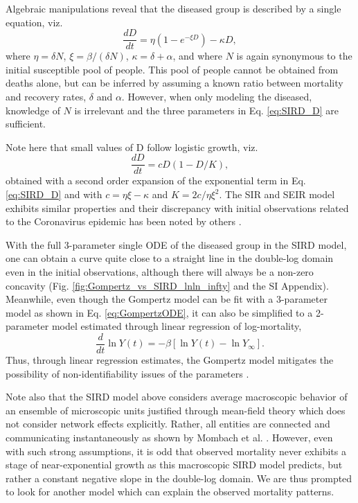 \documentclass[review]{elsarticle}
\begin{document}
Algebraic manipulations reveal that the diseased group is described by a single equation, viz.
\begin{equation}
\label{eq:SIRD_D}
\frac{dD}{dt} = \eta( 1 - e^{-\xi D}) - \kappa D,
\end{equation}
where $\eta = \delta N$, $\xi = \beta/(\delta N)$, $\kappa = \delta + \alpha$, and where $N$ is again synonymous to the initial susceptible pool of people. This pool of people cannot be obtained from deaths alone, but can be inferred by assuming a known ratio between mortality and recovery rates, $\delta$ and $\alpha$. 
However, when only modeling the diseased, knowledge of $N$ is irrelevant and the three parameters in Eq. \ref{eq:SIRD_D} are sufficient.

Note here that small values of D follow logistic growth, viz.
\begin{equation}
\frac{dD}{dt} = c D (1 - D/K),
\end{equation}
obtained with a second order expansion of the exponential term in Eq. \ref{eq:SIRD_D} and with $c=\eta\xi - \kappa$ and $K=2c/\eta\xi^2$. The SIR and SEIR model exhibits similar properties and their discrepancy with initial observations related to the Coronavirus epidemic has been noted by others \citep{vattay2020forecasting}.

With the full 3-parameter single ODE of the diseased group in the SIRD model, one can obtain a curve quite close to a straight line in the double-log domain even in the initial observations, although there will always be a non-zero concavity (Fig. \ref{fig:Gompertz_vs_SIRD_lnln_infty} and the SI Appendix).
Meanwhile, even though the Gompertz model can be fit with a 3-parameter model as shown in Eq. \ref{eq:GompertzODE}, it can also be simplified to a 2-parameter model estimated through linear regression of log-mortality,
\begin{equation}
\label{eq:GompertzODE2param}
\frac{d}{dt}\ln{Y(t)} = -\beta\left[\ln{Y(t)} - \ln {Y_{\infty}}\right].
\end{equation}
Thus, through linear regression estimates, the Gompertz model mitigates the possibility of non-identifiability issues of the parameters \citep{roda2020difficult}.

Note also that the SIRD model above considers average macroscopic behavior of an ensemble of microscopic units justified through mean-field theory \citep{smilkov2014beyond} which does not consider network effects explicitly. Rather, all entities are connected and communicating instantaneously as shown by Mombach et al. \cite{mombach2002mean}.
However, even with such strong assumptions, it is odd that observed mortality never exhibits a stage of near-exponential growth as this macroscopic SIRD model predicts, but rather a constant negative slope in the double-log domain. 
We are thus prompted to look for another model which can explain the observed mortality patterns.
\end{document}
